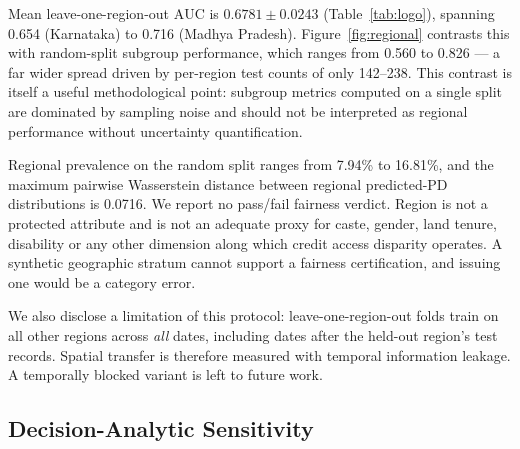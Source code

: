 \documentclass[journal]{IEEEtran}
\newcommand{\auc}{\mbox{AUC}}
\begin{document}
Mean leave-one-region-out $\auc$ is $0.6781\pm0.0243$ (Table~\ref{tab:logo}), spanning 0.654 (Karnataka) to 0.716 (Madhya Pradesh). Figure~\ref{fig:regional} contrasts this with random-split subgroup performance, which ranges from 0.560 to 0.826 --- a far wider spread driven by per-region test counts of only 142--238. This contrast is itself a useful methodological point: subgroup metrics computed on a single split are dominated by sampling noise and should not be interpreted as regional performance without uncertainty quantification.

Regional prevalence on the random split ranges from 7.94\% to 16.81\%, and the maximum pairwise Wasserstein distance between regional predicted-PD distributions is 0.0716. We report no pass/fail fairness verdict. Region is not a protected attribute and is not an adequate proxy for caste, gender, land tenure, disability or any other dimension along which credit access disparity operates. A synthetic geographic stratum cannot support a fairness certification, and issuing one would be a category error.

We also disclose a limitation of this protocol: leave-one-region-out folds train on all other regions across \emph{all} dates, including dates after the held-out region's test records. Spatial transfer is therefore measured with temporal information leakage. A temporally blocked variant is left to future work.

\subsection{Decision-Analytic Sensitivity}
\end{document}
